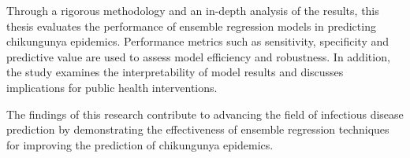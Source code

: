 \begin{spacing}{1.3}
Through a rigorous methodology and an in-depth analysis of the results, this thesis evaluates the performance of ensemble regression models in predicting chikungunya epidemics. Performance metrics such as sensitivity, specificity and predictive value are used to assess model efficiency and robustness. In addition, the study examines the interpretability of model results and discusses implications for public health interventions.

The findings of this research contribute to advancing the field of infectious disease prediction by demonstrating the effectiveness of ensemble regression techniques for improving the prediction of chikungunya epidemics.

\end{spacing}
